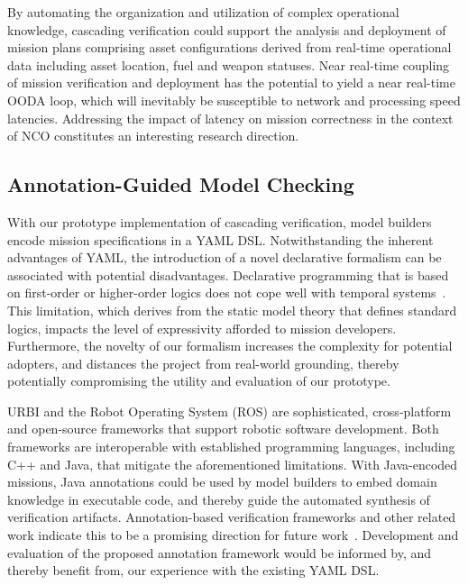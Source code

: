 By automating the organization and utilization of complex operational knowledge, cascading verification could support the analysis and deployment of mission plans comprising asset configurations derived from real-time operational data including asset location, fuel and weapon statuses. Near real-time coupling of mission verification and deployment has the potential to yield a near real-time OODA loop, which will inevitably be susceptible to network and processing speed latencies. Addressing the impact of latency on mission correctness in the context of NCO constitutes an interesting research direction.

\subsection{Annotation-Guided Model Checking}
\label{sec:Annotation_Guided_Model_Checking}

With our prototype implementation of cascading verification, model builders encode mission specifications in a YAML DSL\@. Notwithstanding the inherent advantages of YAML, the introduction of a novel declarative formalism can be associated with potential disadvantages. Declarative programming that is based on first-order or higher-order logics does not cope well with temporal systems~\cite{Lloyd_1994}. This limitation, which derives from the static model theory that defines standard logics, impacts the level of expressivity afforded to mission developers. Furthermore, the novelty of our formalism increases the complexity for potential adopters, and distances the project from real-world grounding, thereby potentially compromising the utility and evaluation of our prototype.

URBI and the Robot Operating System (ROS) are sophisticated, cross-platform and open-source frameworks that support robotic software development. Both frameworks are interoperable with established programming languages, including C++ and Java, that mitigate the aforementioned limitations. With Java-encoded missions, Java annotations could be used by model builders to embed domain knowledge in executable code, and thereby guide the automated synthesis of verification artifacts. Annotation-based verification frameworks and other related work indicate this to be a promising direction for future work~\cite{Chalin_2005,Holmgren_2005,Ferreira_2007}. Development and evaluation of the proposed annotation framework would be informed by, and thereby benefit from, our experience with the existing YAML DSL\@.
